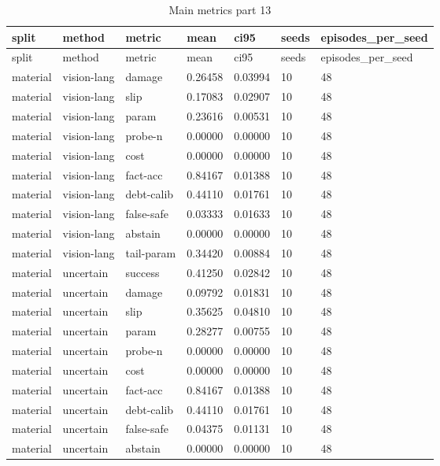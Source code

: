 \documentclass{article}
\begin{document}
\begin{center}
\tiny
\renewcommand{\arraystretch}{0.92}
\setlength{\tabcolsep}{3pt}
\begin{longtable}{lllllll}
\caption{Main metrics part 13}\label{tab:main-metrics-13}\\
\toprule
split & method & metric & mean & ci95 & seeds & episodes\_per\_seed \\
\midrule
\endfirsthead
\toprule
split & method & metric & mean & ci95 & seeds & episodes\_per\_seed \\
\midrule
\endhead
material & vision-lang & damage & 0.26458 & 0.03994 & 10 & 48 \\
material & vision-lang & slip & 0.17083 & 0.02907 & 10 & 48 \\
material & vision-lang & param & 0.23616 & 0.00531 & 10 & 48 \\
material & vision-lang & probe-n & 0.00000 & 0.00000 & 10 & 48 \\
material & vision-lang & cost & 0.00000 & 0.00000 & 10 & 48 \\
material & vision-lang & fact-acc & 0.84167 & 0.01388 & 10 & 48 \\
material & vision-lang & debt-calib & 0.44110 & 0.01761 & 10 & 48 \\
material & vision-lang & false-safe & 0.03333 & 0.01633 & 10 & 48 \\
material & vision-lang & abstain & 0.00000 & 0.00000 & 10 & 48 \\
material & vision-lang & tail-param & 0.34420 & 0.00884 & 10 & 48 \\
material & uncertain & success & 0.41250 & 0.02842 & 10 & 48 \\
material & uncertain & damage & 0.09792 & 0.01831 & 10 & 48 \\
material & uncertain & slip & 0.35625 & 0.04810 & 10 & 48 \\
material & uncertain & param & 0.28277 & 0.00755 & 10 & 48 \\
material & uncertain & probe-n & 0.00000 & 0.00000 & 10 & 48 \\
material & uncertain & cost & 0.00000 & 0.00000 & 10 & 48 \\
material & uncertain & fact-acc & 0.84167 & 0.01388 & 10 & 48 \\
material & uncertain & debt-calib & 0.44110 & 0.01761 & 10 & 48 \\
material & uncertain & false-safe & 0.04375 & 0.01131 & 10 & 48 \\
material & uncertain & abstain & 0.00000 & 0.00000 & 10 & 48 \\

\end{longtable}
\end{center}
\end{document}
